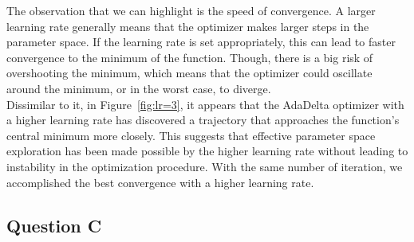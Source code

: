The observation that we can highlight is the speed of convergence. A larger learning rate generally means that the optimizer makes larger steps in the parameter space. If the learning rate is set appropriately, this can lead to faster convergence to the minimum of the function. Though, there is a big risk of overshooting the minimum, which means that the optimizer could oscillate around the minimum, or in the worst case, to diverge.\\
Dissimilar to it, in Figure~\ref{fig:lr=3}, it appears that the AdaDelta optimizer with a higher learning rate has discovered a trajectory that approaches the function's central minimum more closely. This suggests that effective parameter space exploration has been made possible by the higher learning rate without leading to instability in the optimization procedure. With the same number of iteration, we accomplished the best convergence with a higher learning rate.
\vspace{2mm}

\subsection{Question C}


